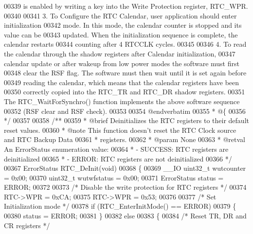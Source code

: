 \begin{DoxyCode}
00339 \textcolor{comment}{     is enabled by writing a key into the Write Protection register, RTC\_WPR.}
00340 \textcolor{comment}{}
00341 \textcolor{comment}{  3. To Configure the RTC Calendar, user application should enter initialization}
00342 \textcolor{comment}{     mode. In this mode, the calendar counter is stopped and its value can be }
00343 \textcolor{comment}{     updated. When the initialization sequence is complete, the calendar restarts }
00344 \textcolor{comment}{     counting after 4 RTCCLK cycles.}
00345 \textcolor{comment}{}
00346 \textcolor{comment}{  4. To read the calendar through the shadow registers after Calendar initialization,}
00347 \textcolor{comment}{     calendar update or after wakeup from low power modes the software must first }
00348 \textcolor{comment}{     clear the RSF flag. The software must then wait until it is set again before }
00349 \textcolor{comment}{     reading the calendar, which means that the calendar registers have been }
00350 \textcolor{comment}{     correctly copied into the RTC\_TR and RTC\_DR shadow registers.}
00351 \textcolor{comment}{     The RTC\_WaitForSynchro() function implements the above software sequence }
00352 \textcolor{comment}{     (RSF clear and RSF check).}
00353 \textcolor{comment}{}
00354 \textcolor{comment}{@endverbatim}
00355 \textcolor{comment}{  * @\{}
00356 \textcolor{comment}{  */}
00357 
00358 \textcolor{comment}{/**}
00359 \textcolor{comment}{  * @brief  Deinitializes the RTC registers to their default reset values.}
00360 \textcolor{comment}{  * @note   This function doesn't reset the RTC Clock source and RTC Backup Data}
00361 \textcolor{comment}{  *         registers.       }
00362 \textcolor{comment}{  * @param  None}
00363 \textcolor{comment}{  * @retval An ErrorStatus enumeration value:}
00364 \textcolor{comment}{  *          - SUCCESS: RTC registers are deinitialized}
00365 \textcolor{comment}{  *          - ERROR: RTC registers are not deinitialized}
00366 \textcolor{comment}{  */}
00367 ErrorStatus RTC_DeInit(\textcolor{keywordtype}{void})
00368 \{
00369   \_\_IO uint32\_t wutcounter = 0x00;
00370   uint32\_t wutwfstatus = 0x00;
00371   ErrorStatus status = ERROR;
00372 
00373   \textcolor{comment}{/* Disable the write protection for RTC registers */}
00374   RTC->WPR = 0xCA;
00375   RTC->WPR = 0x53;
00376 
00377   \textcolor{comment}{/* Set Initialization mode */}
00378   \textcolor{keywordflow}{if} (RTC_EnterInitMode() == ERROR)
00379   \{
00380     status = ERROR;
00381   \}
00382   \textcolor{keywordflow}{else}
00383   \{
00384     \textcolor{comment}{/* Reset TR, DR and CR registers */}

\end{DoxyCode}
